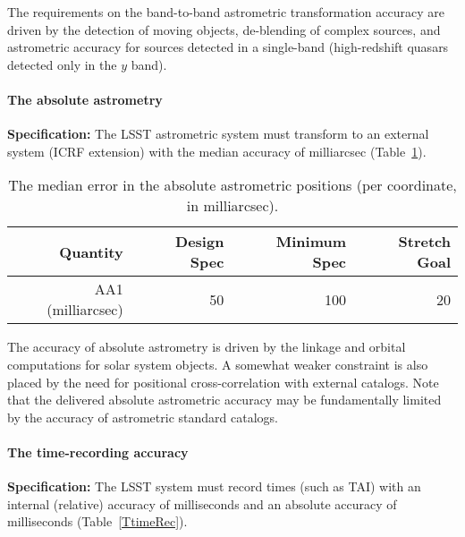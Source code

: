 The requirements on the band-to-band astrometric transformation accuracy
are driven by the detection of moving objects, de-blending of complex
sources, and astrometric accuracy for sources detected in a single-band
(\eg high-redshift quasars detected only in the $y$ band).


\paragraph{The absolute astrometry\\}

{\bf Specification:} The LSST astrometric system must transform to an
external system (\eg ICRF extension) with the median accuracy of
milliarcsec (Table~\ref{TastroAbs}).

\begin{table}[h]
\begin{tabular}{|r|r|r|r|}
\hline
Quantity            & Design Spec & Minimum Spec & Stretch Goal     \\
\hline
  AA1 (milliarcsec)  &    50      &      100    &       20         \\
\hline
\end{tabular}
\caption{The median error in the absolute astrometric positions (per
coordinate, in milliarcsec).}
\label{TastroAbs}
\end{table}

The accuracy of absolute astrometry is driven by the linkage and orbital
computations for solar system objects. A somewhat weaker constraint is also
placed by the need for positional cross-correlation with external
catalogs. Note that the delivered absolute astrometric accuracy may be
fundamentally limited by the accuracy of astrometric standard catalogs.



\paragraph{The time-recording accuracy\\}

{\bf Specification:}
The LSST system must record times (such as TAI)
with an internal (relative) accuracy of
milliseconds and an absolute accuracy of
milliseconds (Table~\ref{TtimeRec}).

